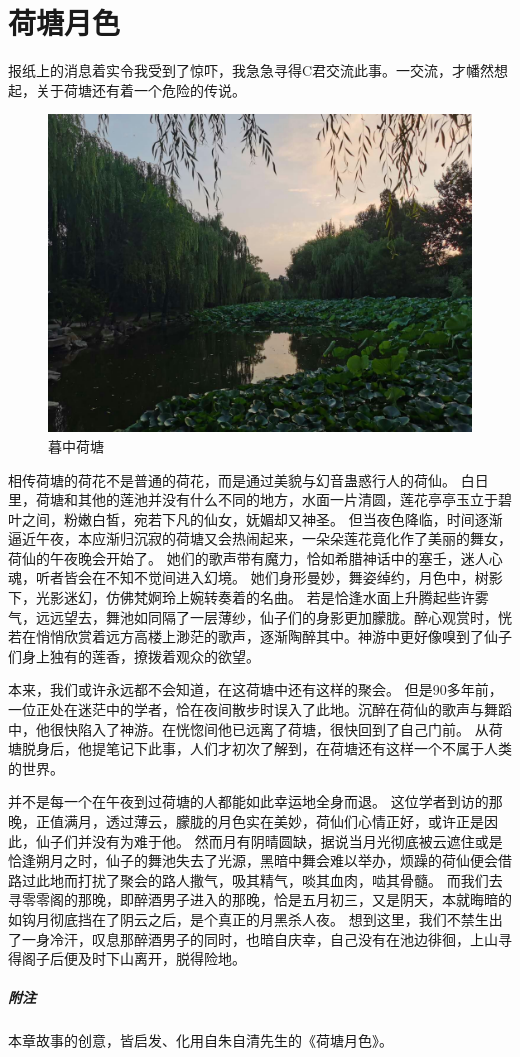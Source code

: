 \chapter{荷塘月色}

报纸上的消息着实令我受到了惊吓，我急急寻得C君交流此事。一交流，才幡然想起，关于荷塘还有着一个危险的传说。

\begin{figure}[!b]
	\centering
	\includegraphics[width=\linewidth]{figures/暮中荷塘.jpg}
	暮中荷塘
\end{figure}

相传荷塘的荷花不是普通的荷花，而是通过美貌与幻音蛊惑行人的荷仙。
白日里，荷塘和其他的莲池并没有什么不同的地方，水面一片清圆，莲花亭亭玉立于碧叶之间，粉嫩白皙，宛若下凡的仙女，妩媚却又神圣。
但当夜色降临，时间逐渐逼近午夜，本应渐归沉寂的荷塘又会热闹起来，一朵朵莲花竟化作了美丽的舞女，荷仙的午夜晚会开始了。
她们的歌声带有魔力，恰如希腊神话中的塞壬，迷人心魂，听者皆会在不知不觉间进入幻境。
她们身形曼妙，舞姿绰约，月色中，树影下，光影迷幻，仿佛梵婀玲上婉转奏着的名曲。
若是恰逢水面上升腾起些许雾气，远远望去，舞池如同隔了一层薄纱，仙子们的身影更加朦胧。醉心观赏时，恍若在悄悄欣赏着远方高楼上渺茫的歌声，逐渐陶醉其中。神游中更好像嗅到了仙子们身上独有的莲香，撩拨着观众的欲望。

本来，我们或许永远都不会知道，在这荷塘中还有这样的聚会。
但是90多年前，一位正处在迷茫中的学者，恰在夜间散步时误入了此地。沉醉在荷仙的歌声与舞蹈中，他很快陷入了神游。在恍惚间他已远离了荷塘，很快回到了自己门前。
从荷塘脱身后，他提笔记下此事，人们才初次了解到，在荷塘还有这样一个不属于人类的世界。

并不是每一个在午夜到过荷塘的人都能如此幸运地全身而退。
这位学者到访的那晚，正值满月，透过薄云，朦胧的月色实在美妙，荷仙们心情正好，或许正是因此，仙子们并没有为难于他。
然而月有阴晴圆缺，据说当月光彻底被云遮住或是恰逢朔月之时，仙子的舞池失去了光源，黑暗中舞会难以举办，烦躁的荷仙便会借路过此地而打扰了聚会的路人撒气，吸其精气，啖其血肉，啮其骨髓。
而我们去寻零零阁的那晚，即醉酒男子进入的那晚，恰是五月初三，又是阴天，本就晦暗的如钩月彻底挡在了阴云之后，是个真正的月黑杀人夜。
想到这里，我们不禁生出了一身冷汗，叹息那醉酒男子的同时，也暗自庆幸，自己没有在池边徘徊，上山寻得阁子后便及时下山离开，脱得险地。

\vfill

\paragraph{附注}
本章故事的创意，皆启发、化用自朱自清先生的《荷塘月色》。
